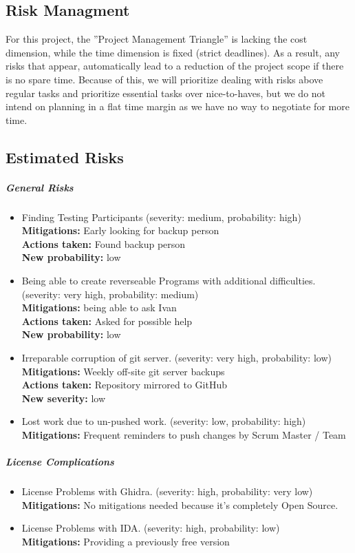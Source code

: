 \subsection{Risk Managment}
For this project, the ”Project Management Triangle” is lacking the cost dimension, while the time dimension is fixed (strict deadlines). As a result, any risks that appear, automatically lead to a reduction of the project scope if there is no spare time. Because of this, we will prioritize dealing with risks above regular tasks and prioritize essential tasks over nice-to-haves, but we do not intend on planning in a flat time margin as we have no way to negotiate for more time.

\subsection{Estimated Risks}

\subparagraph{General Risks}
\begin{itemize}
    \item Finding Testing Participants (severity: medium, probability: high)\\ 
    \textbf{Mitigations:} Early looking for backup person \\ 
    \textbf{Actions taken:} Found backup person\\ 
    \textbf{New probability:} low
    \item Being able to create reverseable Programs with additional difficulties. (severity: very high, probability: medium)\\ 
    \textbf{Mitigations:} being able to ask Ivan \\ 
    \textbf{Actions taken:} Asked for possible help\\ 
    \textbf{New probability:} low
    \item Irreparable corruption of git server. (severity: very high, probability: low)\\ 
    \textbf{Mitigations:} Weekly off-site git server backups\\
    \textbf{Actions taken:} Repository mirrored to GitHub\\ 
    \textbf{New severity:} low
    \item Lost work due to un-pushed work. (severity: low, probability: high)\\ 
    \textbf{Mitigations:} Frequent reminders to push changes by Scrum Master / Team\\
\end{itemize}
\subparagraph{License Complications}
\begin{itemize}
    \item License Problems with Ghidra. (severity: high, probability: very low)\\ 
    \textbf{Mitigations:} No mitigations needed because it's completely Open Source.
    \item License Problems with IDA. (severity: high, probability: low)\\ 
    \textbf{Mitigations:} Providing a previously free version
\end{itemize}